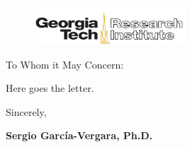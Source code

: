 \documentclass{letter}
\date{\today}
\newcommand{\Sergio}{\textbf{Sergio Garc\'{i}a-Vergara, Ph.D.}}
\begin{document}
\begin{letter}
{
}

\hfill
\begin{figure}%
    \includegraphics[width=0.5\textwidth]{figs/GTRIlogo.jpeg}
\end{figure}

\opening{To Whom it May Concern:} %
\medskip

Here goes the letter.


\medskip
Sincerely, \\
\medskip
\medskip

\Sergio \\

\end{letter}
\end{document}
